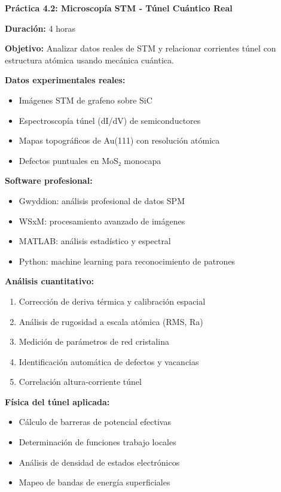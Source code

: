 \begin{tecnologiabox}
\begin{tecnologiabox}
\begin{tecnologiabox}
\begin{practicabox}
	\textbf{Práctica 4.2: Microscopía STM - Túnel Cuántico Real}
	
	\textbf{Duración:} 4 horas
	
	\textbf{Objetivo:} Analizar datos reales de STM y relacionar corrientes túnel con estructura atómica usando mecánica cuántica.
	
	\textbf{Datos experimentales reales:}
	\begin{itemize}
		\item Imágenes STM de grafeno sobre SiC
		\item Espectroscopía túnel (dI/dV) de semiconductores
		\item Mapas topográficos de Au(111) con resolución atómica
		\item Defectos puntuales en MoS₂ monocapa
	\end{itemize}
	
	\textbf{Software profesional:}
	\begin{itemize}
		\item Gwyddion: análisis profesional de datos SPM
		\item WSxM: procesamiento avanzado de imágenes
		\item MATLAB: análisis estadístico y espectral
		\item Python: machine learning para reconocimiento de patrones
	\end{itemize}
	
	\textbf{Análisis cuantitativo:}
	\begin{enumerate}
		\item Corrección de deriva térmica y calibración espacial
		\item Análisis de rugosidad a escala atómica (RMS, Ra)
		\item Medición de parámetros de red cristalina
		\item Identificación automática de defectos y vacancias
		\item Correlación altura-corriente túnel
	\end{enumerate}
	
	\textbf{Física del túnel aplicada:}
	\begin{itemize}
		\item Cálculo de barreras de potencial efectivas
		\item Determinación de funciones trabajo locales
		\item Análisis de densidad de estados electrónicos
		\item Mapeo de bandas de energía superficiales
	\end{itemize}
	

\end{practicabox}
\end{tecnologiabox}
\end{tecnologiabox}
\end{tecnologiabox}
